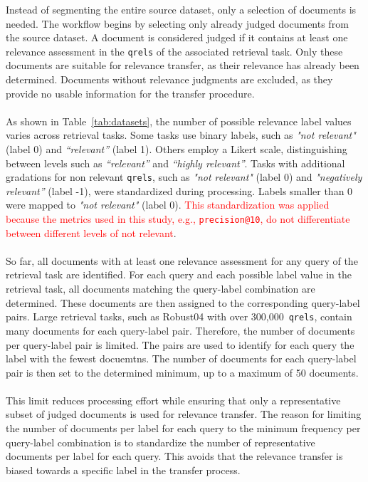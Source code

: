 Instead of segmenting the entire source dataset, only a selection of documents is needed. The workflow begins by selecting only already judged documents from the source dataset. A document is considered judged if it contains at least one relevance assessment in the \texttt{qrels} of the associated retrieval task. Only these documents are suitable for relevance transfer, as their relevance has already been determined. Documents without relevance judgments are excluded, as they provide no usable information for the transfer procedure.
\\\\
As shown in Table~\ref{tab:datasets}, the number of possible relevance label values varies across retrieval tasks. Some tasks use binary labels, such as \textit{"not relevant"} (label 0) and \textit{“relevant”} (label 1). Others employ a Likert scale, distinguishing between levels such as \textit{“relevant”} and \textit{“highly relevant”}. Tasks with additional gradations for non relevant \texttt{qrels}, such as \textit{"not relevant"} (label 0) and \textit{"negatively relevant”} (label -1), were standardized during processing. Labels smaller than 0 were mapped to \textit{"not relevant"} (label 0). \textcolor{red}{This standardization was applied because the metrics used in this study, e.g., \texttt{precision@10}, do not differentiate between different levels of not relevant}.
\\\\
So far, all documents with at least one relevance assessment for any query of the retrieval task are identified. For each query and each possible label value in the retrieval task, all documents matching the query-label combination are determined. These documents are then assigned to the corresponding query-label pairs. Large retrieval tasks, such as Robust04 with over 300,000~\texttt{qrels}, contain many documents for each query-label pair. Therefore, the number of documents per query-label pair is limited. The pairs are used to identify for each query the label with the fewest docuemtns. The number of documents for each query-label pair is then set to the determined minimum, up to a maximum of 50 documents. 
\\\\
This limit reduces processing effort while ensuring that only a representative subset of judged documents is used for relevance transfer. The reason for limiting the number of documents per label for each query to the minimum frequency per query-label combination is to standardize the number of representative documents per label for each query. This avoids that the relevance transfer is biased towards a specific label in the transfer process.

